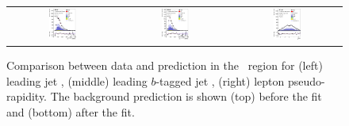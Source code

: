 \begin{figure}[tp]
\begin{tabular}{ccc}
  \includegraphics[width=0.27\textwidth]{Analysis/Figures_ttH/tesis_vars/postfit/jet1_pt_6jetin3btagex.eps} &
  \includegraphics[width=0.27\textwidth]{Analysis/Figures_ttH/tesis_vars/postfit/bjet1_pt_6jetin3btagex.eps} &
  \includegraphics[width=0.27\textwidth]{Analysis/Figures_ttH/tesis_vars/postfit/lep_eta_6jetin3btagex.eps} \\
\end{tabular}
\caption{Comparison between data and prediction in the \sixthree\ region for (left) leading jet \pt, (middle) leading $b$-tagged jet \pt, (right) lepton pseudo-rapidity. The background prediction is shown (top) before the fit and (bottom) after the fit.}
  \label{fig:vars2_sixthree}
\end{figure}

